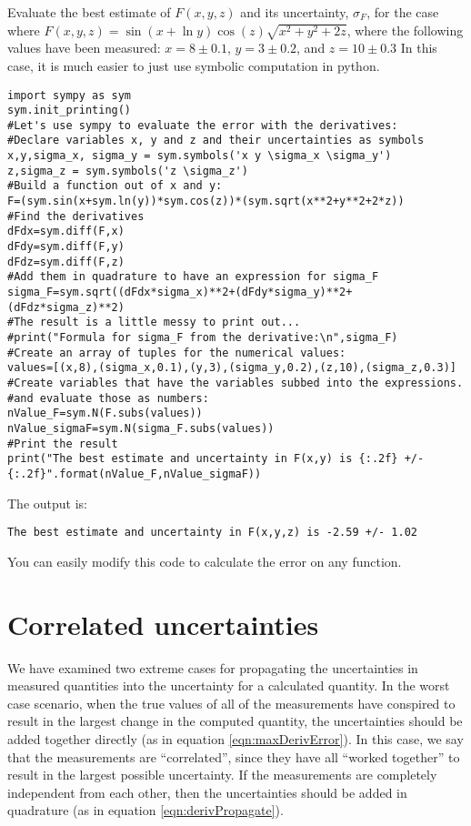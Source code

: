 \begin{example}{}{Evaluate the best estimate of $F(x,y,z)$ and its uncertainty, $\sigma_{F}$, for the case where $F(x,y,z)=\sin(x+\ln y)\cos(z)\sqrt{x^2+y^2+2z}$, where the following values have been measured: $x=8\pm0.1$, $y=3\pm0.2$, and $z=10\pm0.3$ }{}
In this case, it is much easier to just use symbolic computation in python.
\begin{lstlisting}[frame=single] 
import sympy as sym
sym.init_printing()
#Let's use sympy to evaluate the error with the derivatives:
#Declare variables x, y and z and their uncertainties as symbols
x,y,sigma_x, sigma_y = sym.symbols('x y \sigma_x \sigma_y')  
z,sigma_z = sym.symbols('z \sigma_z')
#Build a function out of x and y:
F=(sym.sin(x+sym.ln(y))*sym.cos(z))*(sym.sqrt(x**2+y**2+2*z))
#Find the derivatives
dFdx=sym.diff(F,x)
dFdy=sym.diff(F,y)
dFdz=sym.diff(F,z)
#Add them in quadrature to have an expression for sigma_F
sigma_F=sym.sqrt((dFdx*sigma_x)**2+(dFdy*sigma_y)**2+(dFdz*sigma_z)**2)
#The result is a little messy to print out...
#print("Formula for sigma_F from the derivative:\n",sigma_F)
#Create an array of tuples for the numerical values:
values=[(x,8),(sigma_x,0.1),(y,3),(sigma_y,0.2),(z,10),(sigma_z,0.3)]
#Create variables that have the variables subbed into the expressions.
#and evaluate those as numbers:
nValue_F=sym.N(F.subs(values))
nValue_sigmaF=sym.N(sigma_F.subs(values))
#Print the result
print("The best estimate and uncertainty in F(x,y) is {:.2f} +/- {:.2f}".format(nValue_F,nValue_sigmaF))
\end{lstlisting}
The output is:
\begin{verbatim}
The best estimate and uncertainty in F(x,y,z) is -2.59 +/- 1.02
\end{verbatim}
You can easily modify this code to calculate the error on any function. 
\end{example}

\section{Correlated uncertainties}
\label{sec:corrMeas}
We have examined two extreme cases for propagating the uncertainties in measured quantities into the uncertainty for a calculated quantity. In the worst case scenario, when the true values of all of the measurements have conspired to result in the largest change in the computed quantity, the uncertainties should be added together directly (as in equation \ref{eqn:maxDerivError}). In this case, we say that the measurements are ``correlated'', since they have all ``worked together'' to result in the largest possible uncertainty. If the measurements are completely independent from each other, then the uncertainties should be added in quadrature (as in equation \ref{eqn:derivPropagate}).


